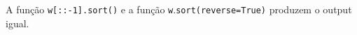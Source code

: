 \documentclass[12pt,varwidth=16cm,border=1pt]{standalone}
\begin{document}
A função \verb+w+\verb+[::-1].sort()+ e a função \verb+w+.\verb+sort(reverse=True)+ produzem o output igual.

\questiomfalse
\end{document}
